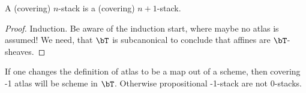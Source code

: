 \begin{lemma}{\label{lemma:succStab}}
	A  (covering) $n$-stack is a  (covering) $n+1$-stack.
\end{lemma}

\begin{proof}
	
	Induction. 	Be aware of the induction start, where maybe no atlas is assumed!
	We need, that $\bT$ is subcanonical to conclude that affines are $\bT$-sheaves.
\end{proof}
\begin{rmk}
	If one changes the definition of atlas to be a map out of a scheme, then covering -1 atlas will be scheme in $\bT$. Otherwise propositional -1-stack are not 0-stacks.
\end{rmk}

